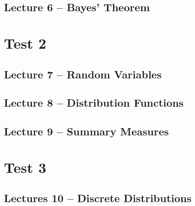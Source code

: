 \documentclass{article}
\begin{document}
\subsection{Lecture 6 -- Bayes' Theorem}
\newpage

\section{Test 2}

\secttoc

\subsection{Lecture 7 -- Random Variables}
\newpage

\subsection{Lecture 8 -- Distribution Functions}
\newpage

\subsection{Lecture 9 -- Summary Measures}
\newpage

\section{Test 3}

\secttoc

\subsection{Lectures 10 -- Discrete Distributions}
\newpage
\end{document}
